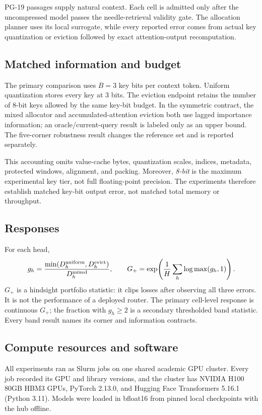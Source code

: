 PG-19 passages supply natural context.  Each cell is admitted only after the
uncompressed model passes the needle-retrieval validity gate.  The allocation
planner uses its local surrogate, while every reported error comes from actual
key quantization or eviction followed by exact attention-output recomputation.

\subsection{Matched information and budget}

The primary comparison uses $B=3$ key bits per context token.  Uniform
quantization stores every key at 3 bits.  The eviction endpoint retains the
number of 8-bit keys allowed by the same key-bit budget.  In the symmetric
contract, the mixed allocator and accumulated-attention eviction both use lagged
importance information; an oracle/current-query result is labeled only as an
upper bound.  The five-corner robustness result changes the reference set and is
reported separately.

This accounting omits value-cache bytes, quantization scales, indices, metadata,
protected windows, alignment, and packing.  Moreover, \emph{8-bit} is the maximum
experimental key tier, not full floating-point precision.  The experiments
therefore establish matched key-bit output error, not matched total memory or
throughput.

\subsection{Responses}

For each head,
\[
 g_h=
 \frac{\min(D_h^{\rm uniform},D_h^{\rm evict})}
 {D_h^{\rm mixed}},
 \qquad
 G_+=\exp\!\left(\frac1H\sum_h\log\max(g_h,1)\right).
\]
$G_+$ is a hindsight portfolio statistic: it clips losses after observing all
three errors.  It is not the performance of a deployed router.  The primary
cell-level response is continuous $G_+$; the fraction with $g_h\ge2$ is a
secondary thresholded band statistic.  Every band result names its corner
and information contracts.

\subsection{Compute resources and software}
\label{app:compute}

All experiments ran as Slurm jobs on one shared academic GPU cluster. 
Every job recorded its GPU and library versions, and the cluster has
NVIDIA H100 80GB HBM3 GPUs, PyTorch 2.13.0, and Hugging Face Transformers
5.16.1 (Python 3.11).  Models were loaded in bfloat16 from pinned local
checkpoints with the hub offline. 

